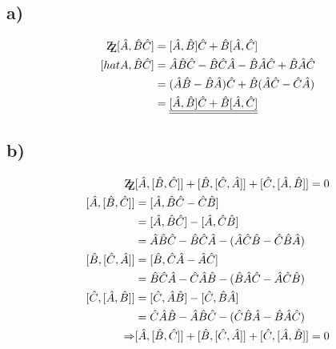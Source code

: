     \subsection{a)}
    \begin{align}
    \mathrm{Z\kern-.3em\raise-0.5ex\hbox{Z}} [\hat A, \hat B \hat C] &= [\hat A , \hat B]\hat C + \hat B [\hat A , \hat C]\\
    [hat A , \hat B \hat C] &= \hat A \hat B \hat C - \hat B \hat C \hat A -\hat B \hat A \hat C + \hat B \hat A \hat C\\
    &=(\hat A \hat B - \hat B \hat A) \hat C + \hat B (\hat A \hat C -\hat C \hat A)\\
    &=\underline{\underline{[\hat A , \hat B]\hat C + \hat B [\hat A , \hat C]}}
    \end{align}
    \subsection{b)}
    \begin{align}
    \mathrm{Z\kern-.3em\raise-0.5ex\hbox{Z}} &[\hat A , [\hat B , \hat C]] + [\hat B ,[\hat C, \hat A]]+ [\hat C,[\hat A , \hat B]] =0\\
    [\hat A , [\hat B , \hat C]] &= [\hat A, \hat B \hat C - \hat C \hat B] \\
    &=[\hat A , \hat B \hat C] -[\hat A , \hat C \hat B]\\
    &= \hat A \hat B \hat C -\hat B \hat C \hat A- (\hat A \hat C \hat B-\hat C \hat B \hat A)\\
    [\hat B , [\hat C , \hat A]] &= [\hat B, \hat C \hat A-\hat A \hat C]\\
    &= \hat B \hat C \hat A - \hat C \hat A \hat B - (\hat B \hat A \hat C - \hat A \hat C \hat B)\\
    [\hat C , [\hat A , \hat B]] &= [\hat C , \hat A \hat B]- [\hat C , \hat B \hat A]\\
    &= \hat C \hat A \hat B - \hat A \hat B \hat C -(\hat C \hat B \hat A - \hat B \hat A \hat C)\\
    \Rightarrow &[\hat A , [\hat B , \hat C]] + [\hat B , [\hat C , \hat A]] +[\hat C , [\hat A , \hat B]] = 0
    \end{align}
